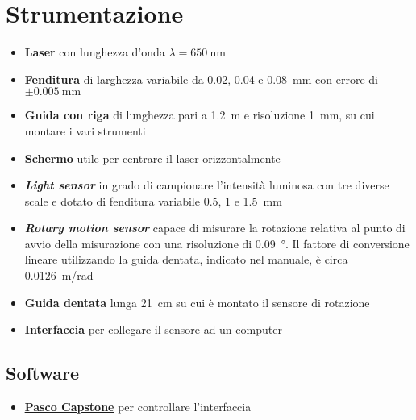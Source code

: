 \documentclass[../main.tex]{subfiles}
\begin{document}
\section{Strumentazione}

\begin{itemize}
    \item \textbf{Laser} con lunghezza d'onda $\lambda = \qty{650}{\nano\meter}$
    \item \textbf{Fenditura} di larghezza variabile da \num{0.02}, \num{0.04} e \qty{0.08}{\milli\meter} con errore di $\pm \qty{0.005}{\milli\meter}$
    \item \textbf{Guida con riga} di lunghezza pari a \qty{1.2}{\meter} e risoluzione \qty{1}{\milli\meter}, su cui montare i vari strumenti
    \item \textbf{Schermo} utile per centrare il laser orizzontalmente
    \item \textbf{\textit{Light sensor}} in grado di campionare l'intensità luminosa con tre diverse scale e dotato di fenditura variabile \num{0.5}, \num{1} e \qty{1.5}{\milli\meter}
    \item \textbf{\textit{Rotary motion sensor}} capace di misurare la rotazione relativa al punto di avvio della misurazione con una risoluzione di \qty{0.09}{\degree}. Il fattore di conversione lineare utilizzando la guida dentata, indicato nel manuale, è circa \qty{0.0126}{\meter/\radian}
    \item \textbf{Guida dentata} lunga \qty{21}{\centi\meter} su cui è montato il sensore di rotazione
    \item \textbf{Interfaccia} per collegare il sensore ad un computer
\end{itemize}

\subsection{Software}

\begin{itemize}
    \item \textbf{\href{https://www.pasco.com/downloads/capstone}{\underline{Pasco Capstone}}} per controllare l'interfaccia
\end{itemize}
\end{document}
